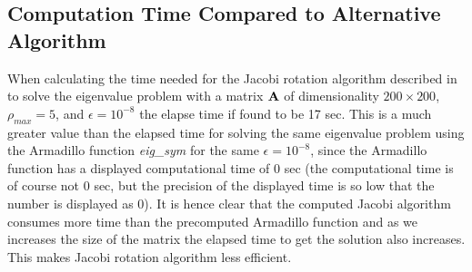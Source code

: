 \subsection{Computation Time Compared to Alternative Algorithm}
\label{subsec:CompTime}
When calculating the time needed for the Jacobi rotation algorithm described in  to solve the eigenvalue problem with a matrix $\mbox{\textbf{A}}$ of dimensionality $200 \times 200$, $\rho_{max} = 5$, and $\epsilon = 10^{-8}$ the elapse time if found to be 17 sec.
This is a much greater value than the elapsed time for solving the same eigenvalue problem using the Armadillo function 
\textit{eig\_sym} 
for the same $\epsilon = 10^{-8}$, since the Armadillo function has a displayed computational time of 0 sec (the computational time is of course not 0 sec, but the precision of the displayed time is so low that the number is displayed as 0). 
It is hence clear that the computed Jacobi algorithm consumes more time than the precomputed Armadillo function and as we increases the size of the matrix the elapsed time to get the solution also increases. 
This makes Jacobi rotation algorithm less efficient.

